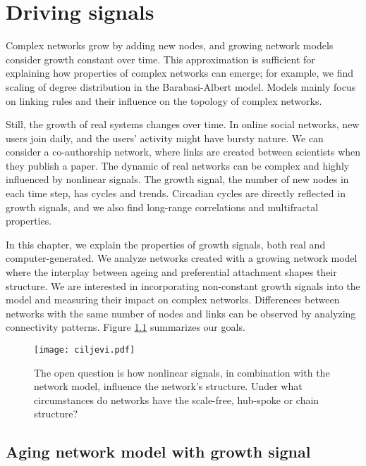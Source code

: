 
\chapter{Driving signals} %
\label{Ch:signals} %

Complex networks grow by adding new nodes, and growing network models consider growth constant over time. This approximation is sufficient for explaining how properties of complex networks can emerge; for example, we find scaling of degree distribution in the Barabasi-Albert model. Models mainly focus on linking rules and their influence on the topology of complex networks. 

Still, the growth of real systems changes over time. In online social networks, new users join daily, and the users' activity might have bursty nature. We can consider a co-authorship network, where links are created between scientists when they publish a paper. The dynamic of real networks can be complex and highly influenced by nonlinear signals. The growth signal, the number of new nodes in each time step, has cycles and trends. Circadian cycles are directly reflected in growth signals, and we also find long-range correlations and multifractal properties. 

In this chapter, we explain the properties of growth signals, both real and computer-generated. We analyze networks created with a growing network model where the interplay between ageing and preferential attachment shapes their structure. We are interested in incorporating non-constant growth signals into the model and measuring their impact on complex networks. Differences between networks with the same number of nodes and links can be observed by analyzing connectivity patterns. Figure \ref{fig:ciljevi} summarizes our goals. 

\begin{figure}[!ht]
	\centering
	\texttt{[image: ciljevi.pdf]}
	\caption[Nonlinear growth of the network.]{The open question is how nonlinear signals, in combination with the network model, influence the network's structure. Under what circumstances do networks have the scale-free, hub-spoke or chain structure? }
	\label{fig:ciljevi}
\end{figure}

\section{Aging network model with growth signal}

